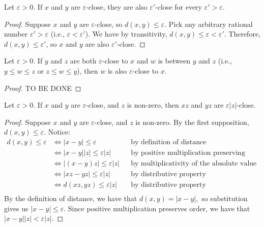 \begin{proposition}
    Let $\varepsilon > 0.$ If $x$ and $y$ are $\varepsilon$-close, they are also $\varepsilon'$-close for every $\varepsilon' > \varepsilon$.
\end{proposition}
\begin{proof}
    Suppose $x$ and $y$ are $\varepsilon$-close, so $d(x, y) \leq \varepsilon.$
    Pick any arbitrary rational number $\varepsilon ' > \varepsilon$ (i.e., $\varepsilon < \varepsilon '$).
    We have by transitivity, $d(x, y) \leq \varepsilon < \varepsilon '$.
    Therefore, $d(x, y) \leq \varepsilon '$, so $x$ and $y$ are also $\varepsilon '$-close.
\end{proof}

\begin{proposition}
    Let $\varepsilon > 0.$ If $y$ and $z$ are both $\varepsilon$-close to $x$ and $w$ is between $y$ and $z$ (i.e., $y \leq w \leq z$ or $z \leq w \leq y$), then $w$ is also $\varepsilon$-close to $x$.
\end{proposition}
\begin{proof}
    TO BE DONE
\end{proof}

\begin{proposition}
    Let $\varepsilon > 0.$ If $x$ and $y$ are $\varepsilon$-close, and $z$ is non-zero, then $xz$ and $yz$ are $\varepsilon \lvert z \rvert$-close.
\end{proposition}
\begin{proof}
    Suppose $x$ and $y$ are $\varepsilon$-close, and $z$ is non-zero.
    By the first supposition, $d(x, y) \leq \varepsilon.$ Notice:
    \begin{align*}
        d(x, y) \leq \varepsilon &\iff \lvert x - y \rvert \leq \varepsilon &&\text{by definition of distance} \\
        &\iff \lvert x - y \rvert \lvert z \rvert \leq \varepsilon \lvert z \rvert &&\text{by positive multiplication preserving order} \\
        &\iff \lvert (x - y) z \rvert \leq \varepsilon \lvert z \rvert &&\text{by multiplicativity of the absolute value} \\
        &\iff \lvert xz - yz \rvert \leq \varepsilon \lvert z \rvert &&\text{by distributive property} \\
        &\iff d(xz, yz) \leq \varepsilon \lvert z \rvert &&\text{by distributive property} \\
    \end{align*}
    By the definition of distance, we have that $d(x, y) = \lvert x - y \rvert,$
    so substitution gives us $\lvert x -  y \rvert \leq \varepsilon.$
    Since positive multiplication preserves order, we have that $\lvert x - y \rvert \lvert z \rvert < \varepsilon \lvert z \rvert$.
\end{proof}

